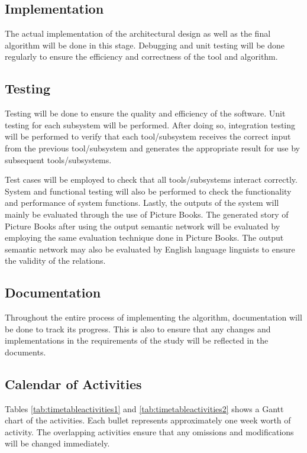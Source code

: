 \subsection{Implementation}

The actual implementation of the architectural design as well as the final algorithm will be done in this stage. Debugging and unit testing will be done regularly to ensure the efficiency and correctness of the tool and algorithm.  

\subsection{Testing}

Testing will be done to ensure the quality and efficiency of the software. Unit testing for each subsystem will be performed. After doing so, integration testing will be performed to verify that each tool/subsystem receives the correct input from the previous tool/subsystem and generates the appropriate result for use by subsequent tools/subsystems. 

Test cases will be employed to check that all tools/subsystems interact correctly. System and functional testing will also be performed to check the functionality and performance of system functions. Lastly, the outputs of the system will mainly be evaluated through the use of Picture Books. The generated story of Picture Books after using the output semantic network will be evaluated by employing the same evaluation technique done in Picture Books. The output semantic network may also be evaluated by English language linguists to ensure the validity of the relations.

\subsection{Documentation}

Throughout the entire process of implementing the algorithm, documentation will be done to track its progress. This is also to ensure that any changes and implementations in the requirements of the study will be reflected in the documents.

\subsection{Calendar of Activities}

Tables \ref{tab:timetableactivities1} and \ref{tab:timetableactivities2} shows a Gantt chart of the activities. Each bullet represents approximately one week worth of activity. The overlapping activities ensure that any omissions and modifications will be changed immediately. 

